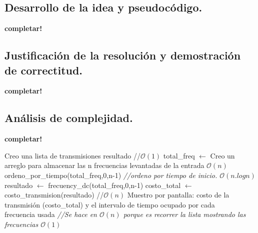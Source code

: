 


\newpage
\subsection{Desarrollo de la idea y pseudocódigo.}

\vspace*{0.3cm}

\textbf{completar!}

\newpage
\subsection{Justificación de la resolución y demostración de correctitud.}

\vspace*{0.3cm}

\textbf{completar!}



\newpage
\subsection{Análisis de complejidad.}

\vspace*{0.3cm}

\textbf{completar!}

\begin{codebox}
\li Creo una lista de transmisiones resultado  //$\mathcal{O}(1)$ 
\li total_freq $\leftarrow$ Creo un arreglo para almacenar las n frecuencias levantadas de la entrada $\mathcal{O}(n)$
\li ordeno_por_tiempo(total_freq,0,n-1) {\it //ordeno por tiempo de inicio. $\mathcal{O}(n.logn)$}
\li resultado $\leftarrow$ frecuency_dc(total_freq,0,n-1)
\li costo_total $\leftarrow$ costo_transmision(resultado) //$\mathcal{O}(n)$
\li Muestro por pantalla: costo de la transmisión (costo_total) y el intervalo de tiempo ocupado por cada\\ frecuencia usada {\it //Se hace en $\mathcal{O}(n)$ porque es recorrer la lista mostrando las frecuencias $\mathcal{O}(1)$}
\end{codebox}

